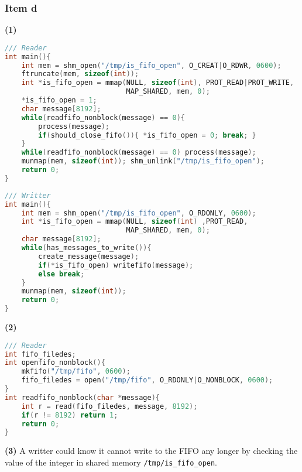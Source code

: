 {\subsubsection{Item d}
\textbf{(1)}
\begin{lstlisting}[language=C]
/// Reader
int main(){
    int mem = shm_open("/tmp/is_fifo_open", O_CREAT|O_RDWR, 0600);
    ftruncate(mem, sizeof(int));
    int *is_fifo_open = mmap(NULL, sizeof(int), PROT_READ|PROT_WRITE,
                             MAP_SHARED, mem, 0);
    *is_fifo_open = 1;
    char message[8192];
    while(readfifo_nonblock(message) == 0){
        process(message);
        if(should_close_fifo()){ *is_fifo_open = 0; break; }
    }
    while(readfifo_nonblock(message) == 0) process(message);
    munmap(mem, sizeof(int)); shm_unlink("/tmp/is_fifo_open");
    return 0;
}
\end{lstlisting}
\begin{lstlisting}[language=C]
/// Writter
int main(){
    int mem = shm_open("/tmp/is_fifo_open", O_RDONLY, 0600);
    int *is_fifo_open = mmap(NULL, sizeof(int) ,PROT_READ,
                             MAP_SHARED, mem, 0);
    char message[8192];
    while(has_messages_to_write()){
        create_message(message);
        if(*is_fifo_open) writefifo(message);
        else break;
    }
    munmap(mem, sizeof(int));
    return 0;
}
\end{lstlisting}

\textbf{(2)}
\begin{lstlisting}[language=C]
/// Reader
int fifo_filedes;
int openfifo_nonblock(){
    mkfifo("/tmp/fifo", 0600);
    fifo_filedes = open("/tmp/fifo", O_RDONLY|O_NONBLOCK, 0600);
}
int readfifo_nonblock(char *message){
    int r = read(fifo_filedes, message, 8192);
    if(r != 8192) return 1;
    return 0;
}
\end{lstlisting}
\textbf{(3)}
A writter could know it cannot write to the FIFO any longer by checking the value of the integer in shared memory \texttt{/tmp/is\_fifo\_open}.


}
